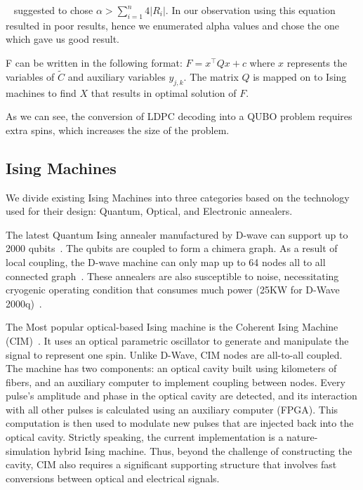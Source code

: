 ~\cite{tawada2020new} suggested to chose $\alpha > \sum_{i=1}^{n} 4|R_i|$. In our observation using this equation resulted in poor results, hence we enumerated alpha values and chose the one which gave us good result.

F can be written in the following format: $F = x^\top Qx +c$ where $x$ represents the variables of $\tilde{C}$ and auxiliary variables $y_{j,k}$. The matrix $Q$ is mapped on to Ising machines to find $X$ that results in optimal solution of $F$.  

As we can see, the conversion of LDPC decoding into a QUBO problem requires extra spins, which increases the size of the problem.

\subsection{Ising Machines}

We divide existing Ising Machines into three categories based on the technology used for their design: Quantum, Optical, and Electronic annealers. 

The latest Quantum Ising annealer manufactured by D-wave can support up to 2000 qubits~\cite{D-Wave}. The qubits are coupled to form a chimera graph. As a result of local coupling, the D-wave machine can only map up to 64 nodes all to all connected graph~\cite{hamerly2019experimental, hamerly2018scaling}. These annealers are also susceptible to noise, necessitating cryogenic operating condition that consumes much power (25KW for D-Wave 2000q)~\cite{dwave_stats}.

The Most popular optical-based Ising machine is the Coherent Ising Machine (CIM)~\cite{inagaki2016cim, cim_yamamoto, McMahon614, 16bit_cim, ncomm_bohm2019}. It uses an optical parametric oscillator to generate and manipulate the signal to represent one spin. Unlike D-Wave, CIM nodes are all-to-all coupled. The machine has two components: an optical cavity built using kilometers of fibers, and an auxiliary computer to implement coupling between nodes. Every pulse's amplitude and phase in the optical cavity are detected, and its interaction with all other pulses is calculated using an auxiliary computer (FPGA). This computation is then used to modulate new pulses that are injected back into the optical cavity. Strictly speaking, the current implementation is a nature-simulation hybrid Ising machine. Thus, beyond the challenge of constructing the cavity, CIM  also requires a significant supporting structure that involves fast conversions between optical and electrical signals. 


